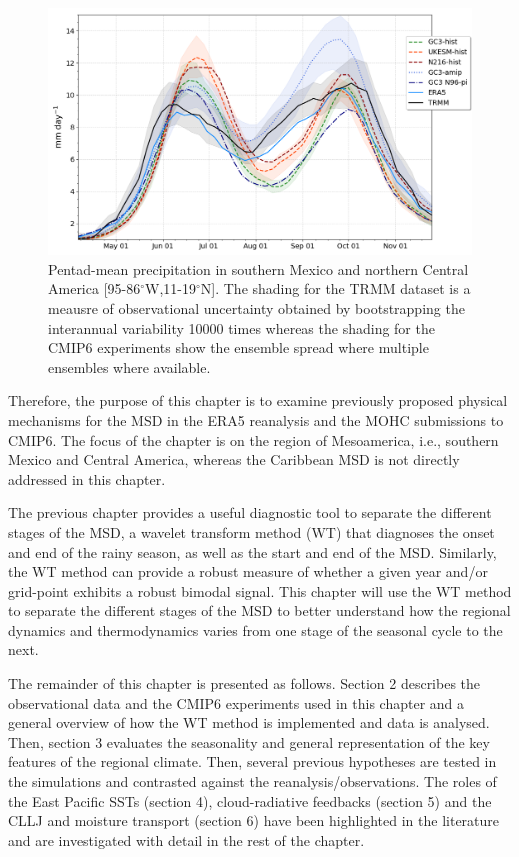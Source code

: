  \begin{figure}[t!]
\includegraphics[width=\linewidth]{figures/seasonal_cycle_p3.png}
\caption{Pentad-mean precipitation in southern Mexico and northern Central America [95-86$^\circ$W,11-19$^\circ$N]. The shading for the TRMM dataset is a meausre of observational uncertainty obtained by bootstrapping the interannual variability 10000 times whereas the shading for the CMIP6 experiments show the ensemble spread where multiple ensembles where available. }
\label{fig:msdcaribb}
\end{figure} 
 
  Therefore, the purpose of this chapter is to examine previously proposed physical mechanisms for the MSD in the ERA5 reanalysis and the MOHC submissions to CMIP6. The focus of the chapter is on the region of Mesoamerica, i.e., southern Mexico and Central America, whereas the Caribbean MSD is not directly addressed in this chapter.

The previous chapter provides a useful diagnostic tool to separate the different stages of the MSD, a wavelet transform method (WT) that diagnoses the onset and end of the rainy season, as well as the start and end of the MSD. Similarly, the WT method can provide a robust measure of whether a given year and/or grid-point exhibits a robust bimodal signal. This chapter will use the WT method to separate the different stages of the MSD to better understand how the regional dynamics and thermodynamics varies from one stage of the seasonal cycle to the next. 

The remainder of this chapter is presented as follows. Section 2 describes the observational data and the CMIP6 experiments used in this chapter and a general overview of how the WT method is implemented and data is analysed. Then, section 3 evaluates the seasonality and general representation of the key features of the regional climate.
Then, several previous hypotheses are tested in the simulations and contrasted against the reanalysis/observations. 
The roles of the East Pacific SSTs (section 4), cloud-radiative feedbacks (section 5) and the CLLJ and moisture transport (section 6) have been highlighted in the literature and are investigated with detail in the rest of the chapter.
  
